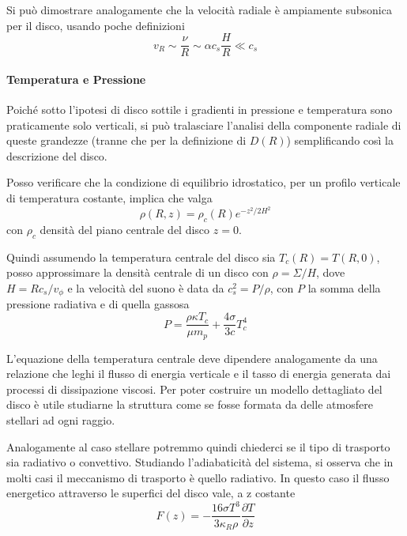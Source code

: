 \documentclass[a4paperbi]{article}
\begin{document}
	Si può dimostrare analogamente che la velocità radiale è ampiamente subsonica per il disco, usando poche definizioni
	\begin{equation}
		v_R\sim\frac{\nu}{R}\sim\alpha c_s\frac{H}{R}\ll c_s
	\end{equation}
	
	\paragraph{Temperatura e Pressione} Poiché sotto l'ipotesi di disco sottile i gradienti in pressione e temperatura sono praticamente solo verticali, si può tralasciare l'analisi della componente radiale di queste grandezze (tranne che per la definizione di $D(R)$) semplificando così la descrizione del disco.
	
	Posso verificare che la condizione di equilibrio idrostatico, per un profilo verticale di temperatura costante, implica che valga
	\begin{equation*}
		\rho(R,z)=\rho_c(R)e^{-z^2/2H^2}
	\end{equation*}
	con $\rho_c$ densità del piano centrale del disco $z=0$.
	
	Quindi assumendo la temperatura centrale del disco sia $T_c(R)=T(R,0)$, posso approssimare la densità centrale di un disco con $\rho=\Sigma/H$, dove $H=Rc_s/v_\phi$ e la velocità del suono è data da $c_s^2=P/\rho$, con $P$ la somma della pressione radiativa e di quella gassosa
	\begin{equation}
		P=\frac{\rho\kappa T_c}{\mu m_p}+\frac{4\sigma}{3c}T_c^4
	\end{equation}
	
	L'equazione della temperatura centrale deve dipendere analogamente da una relazione che leghi il flusso di energia verticale e il tasso di energia generata dai processi di dissipazione viscosi. Per poter costruire un modello dettagliato del disco è utile studiarne la struttura come se fosse formata da delle atmosfere stellari ad ogni raggio. 
	
	Analogamente al caso stellare potremmo quindi chiederci se il tipo di trasporto sia  radiativo o convettivo. Studiando l'adiabaticità del sistema, si osserva che in molti casi il meccanismo di trasporto è quello radiativo. In questo caso il flusso energetico attraverso le superfici del disco vale, a z costante
	\begin{equation}
		F(z)=-\frac{16\sigma T^3}{3\kappa_R\rho}\frac{\partial T}{\partial z}
	\end{equation}
	
\end{document}
